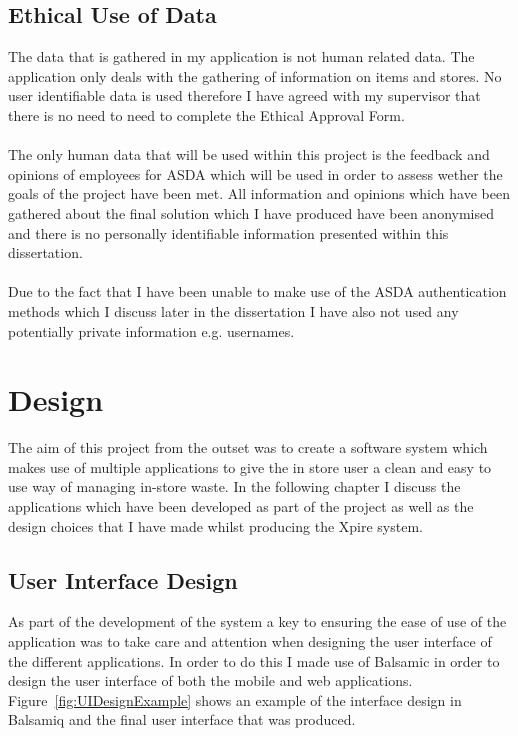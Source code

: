 \documentclass[a4paper,11pt]{report}
\begin{document}
\section{Ethical Use of Data}
The data that is gathered in my application is not human related data.
The application only deals with the gathering of information on items and stores.
No user identifiable data is used therefore I have agreed with my supervisor that
there is no need to need to complete the Ethical Approval Form.
\\
\\
The only human data that will be used within this project is the feedback and opinions
of employees for ASDA which will be used in order to assess wether the goals of the 
project have been met. All information and opinions which have been gathered about the final solution which I have produced have been anonymised and there is no personally identifiable information presented within this dissertation.
\\
\\
Due to the fact that I have been unable to make use of the ASDA authentication methods which I discuss later in the dissertation I have also not used any potentially private information e.g. usernames.


\chapter{Design}
The aim of this project from the outset was to create a software system which makes use of multiple applications
 to give the in store user a clean and easy to use way of managing in-store waste. In the following chapter I 
 discuss the applications which have been developed as part of the project as well as the design choices that I have made whilst producing the Xpire system.

\section{User Interface Design}

As part of the development of the system a key to ensuring the ease of use of the application was to take care and attention when
designing the user interface of the different applications. In order to do this I made use of Balsamic\cite{balsamiq} in order to design the user
interface of both the mobile and web applications. Figure~\ref{fig:UIDesignExample} shows an example of the 
interface design in Balsamiq and the final user interface that was produced. 
\end{document}
